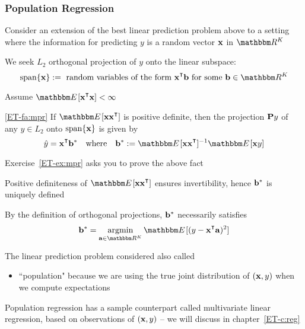 \begin{frame}\frametitle{Population Regression}

    \vspace{2em}
    Consider an extension of the best linear prediction problem above to a setting 
    where the information for
    predicting $y$ is a random vector ${\mathbf x}$ in $\RR^K$ 
    
    We
    seek $L_2$ orthogonal projection of $y$ onto the linear subspace:
    \begin{equation*}
    \Span\{\boldx\} 
    := \text{ random variables of the form
        $\boldx^\T \boldb$ for some $\boldb \in \RR^K$} 
    \end{equation*}
    
    \vspace{1em}
    Assume $\EE[ \boldx^\T \boldx] < \infty$
    

\end{frame}


\begin{frame}
    
    \vspace{2em}
    \Fact\eqref{ET-fa:mpr}
    If $\EE[\boldx \boldx^\T]$ is positive definite, then the projection $\mathbf P y$ of any $y
    \in L_2$ onto $\operatorname{span}\{{\mathbf x}\}$ is given by
    \begin{equation*}
        \label{eq:mpr}
      \hat y = \boldx^\T \boldb^*      
      \quad \text{where} \quad
      \boldb^* := \EE[\boldx \boldx^\T]^{-1} \EE[\boldx y]
    \end{equation*}

    
    \vspace{1em}
    Exercise~\ref{ET-ex:mpr} asks you to prove the above fact
    
    Positive definiteness of
    $\EE[\boldx \boldx^\T]$ ensures invertibility, hence
    ${\mathbf b}^*$ is uniquely defined
    
    By the definition of orthogonal projections, ${\mathbf b}^*$ necessarily
    satisfies 
    \begin{equation*}
        \boldb^* = \argmin_{\bolda \in \RR^K} \EE[ (y - \boldx^\T \bolda)^2 ]
    \end{equation*}
\end{frame}

\begin{frame}

    \vspace{2em}
    The linear prediction problem considered also called 
    \begin{itemize}
        \item ``population" because we are using
            the true joint distribution of $({\mathbf x}, y)$ when we compute expectations
    \end{itemize}
    
    \vspace{1em}
    Population regression has a sample counterpart called multivariate linear
    regression, based on observations of $({\mathbf x}, y)$ -- we will discuss in chapter~\ref{ET-c:reg}
    
\end{frame}

